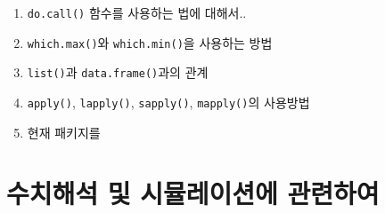 \documentclass{article}
\begin{document}
\begin{enumerate}
\item \texttt{do.call()} 함수를 사용하는 법에 대해서..

\item \texttt{which.max()}와 \texttt{which.min()}을 사용하는 방법 

\item \texttt{list()}과 \texttt{data.frame()}과의 관계

\item \texttt{apply()}, \texttt{lapply()}, \texttt{sapply()}, \texttt{mapply()}의 사용방법

\item 현재 패키지를



% 


\end{enumerate}

%
%

\section{수치해석 및 시뮬레이션에 관련하여}
\end{document}
